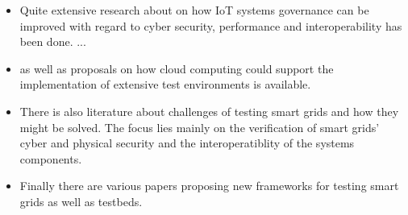 \begin{itemize}
\item Quite extensive research about on how IoT systems governance can be improved with regard to cyber security, performance and interoperability has been done. ...
\item as well as proposals on how cloud computing could support the implementation of extensive test environments is available. 
\item There is also literature about challenges of testing smart grids and how they might be solved. The focus lies mainly on the verification of smart grids' cyber and physical security and the interoperatiblity of the systems components.
\item Finally there are various papers proposing new frameworks for testing smart grids as well as testbeds.
\end{itemize}
